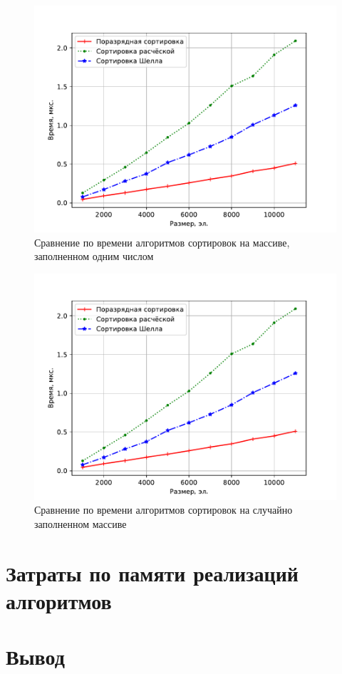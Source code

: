 \begin{figure}[H]
	\centering
	\includegraphics[height=0.4\textheight, page=3]{img/figures.pdf}
	\caption{Сравнение по времени алгоритмов сортировок на массиве, заполненном одним числом}
	\label{plt:time_03}
\end{figure}

\begin{figure}[H]
	\centering
	\includegraphics[height=0.4\textheight, page=4]{img/figures.pdf}
	\caption{Сравнение по времени алгоритмов сортировок на случайно заполненном массиве}
	\label{plt:time_03}
\end{figure}

\section{Затраты по памяти реализаций алгоритмов}

\section*{Вывод}
